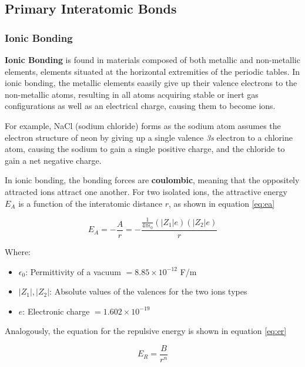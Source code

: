 \documentclass{article}
\begin{document}
\subsection{Primary Interatomic Bonds}

\subsubsection{Ionic Bonding}

\textbf{Ionic Bonding} is found in materials composed of both metallic and non-metallic elements, elements situated at the horizontal extremities of the periodic tables. In ionic bonding, the metallic elements eaasily give up their valence electrons to the non-metallic atoms, resulting in all atoms acquiring stable or inert gas configurations as well as an electrical charge, causing them to become ions. 

For example, NaCl (sodium chloride) forms as the sodium atom assumes the electron structure of neon by giving up a single valence \textit{3s} electron to a chlorine atom, causing the sodium to gain a single positive charge, and the chloride to gain a net negative charge.

In ionic bonding, the bonding forces are \textbf{coulombic}, meaning that the oppositely attracted ions attract one another. For two isolated ions, the attractive energy $E_A$ is a function of the interatomic distance $r$, as shown in equation \ref{eq:ea}

\begin{equation}\label{eq:ea} 
    E_A = -\frac{A}{r} = -\frac{\frac{1}{4\pi\epsilon_0}(|Z_1|e)(|Z_2|e)}{r}
\end{equation}

Where:

\begin{itemize}
    \item $\epsilon_0$: Permittivity of a vacuum $= 8.85 \times 10^{-12}$ F/m
    \item $|Z_1|, |Z_2|$: Absolute values of the valences for the two ions types
    \item $e$: Electronic charge $= 1.602 \times 10^{-19}$
\end{itemize}

Analogously, the equation for the repulsive energy is shown in equation \ref{eq:er}

\begin{equation}\label{eq:er}
    E_R = \frac{B}{r^n}
\end{equation}
\end{document}
